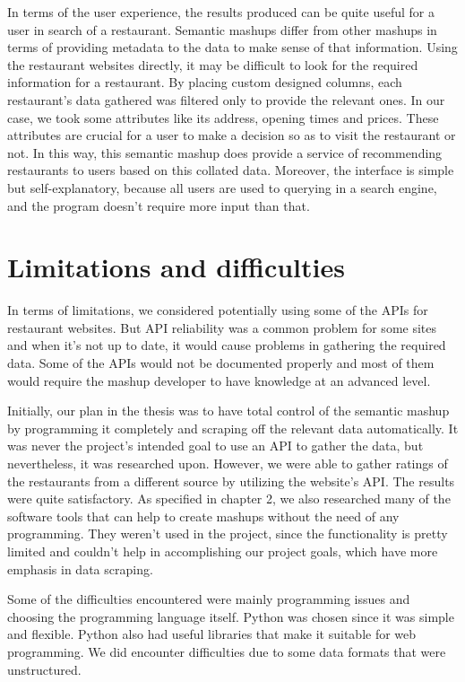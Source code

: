 In terms of the user experience, the results produced can be quite useful for a user in search of a restaurant. Semantic mashups differ from other mashups in terms of providing metadata to the data to make sense of that information. Using the restaurant websites directly, it may be difficult to look for the required information for a restaurant. By placing custom designed columns, each restaurant’s data gathered was filtered only to provide the relevant ones. In our case, we took some attributes like its address, opening times and prices. These attributes are crucial for a user to make a decision so as to visit the restaurant or not. In this way, this semantic mashup does provide a service of recommending restaurants to users based on this collated data. Moreover, the interface is simple but self-explanatory, because all users are used to querying in a search engine, and the program doesn't require more input than that.

\section{Limitations and difficulties}
In terms of limitations, we considered potentially using some of the APIs for restaurant websites. But API reliability was a common problem for some sites and when it’s not up to date, it would cause problems in gathering the required data. Some of the APIs would not be documented properly and most of them would require the mashup developer to have knowledge at an advanced level.

Initially, our plan in the thesis was to have total control of the semantic mashup by programming it completely and scraping off the relevant data automatically. It was never the project’s intended goal to use an API to gather the data, but nevertheless, it was researched upon. However, we were able to gather ratings of the restaurants from a different source by utilizing the website’s API. The results were quite satisfactory. As specified in chapter 2, we also researched many of the software tools that can help to  create mashups without the need of any programming. They weren’t used in the project, since the functionality is pretty limited and couldn’t help in accomplishing our project goals, which have more emphasis in data scraping.

Some of the difficulties encountered were mainly programming issues and choosing the programming language itself. Python was chosen since it was simple and flexible. Python also had useful libraries that make it suitable for web programming. We did encounter difficulties due to some data formats that were unstructured.
